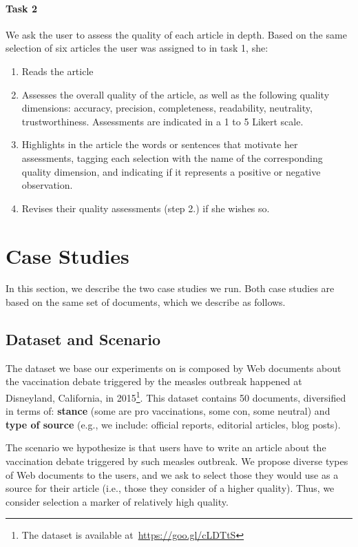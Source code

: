 \documentclass{llncs}
\begin{document}
\paragraph{Task 2}
We ask the user to assess the quality of each article in depth. Based on the same selection of six articles the user was assigned to in task 1, she:
\begin{enumerate}
\item Reads the article
\item Assesses the overall quality of the article, as well as the following quality dimensions: accuracy, precision, completeness, readability, neutrality, trustworthiness. Assessments are indicated in a 1 to 5 Likert scale.
\item Highlights in the article the words or sentences that motivate her assessments, tagging each selection with the name of the corresponding quality dimension, and indicating if it represents a positive or negative observation.
\item Revises their quality assessments (step 2.) if she wishes so.
\end{enumerate}

\section{Case Studies}
\label{sec:results}
In this section, we describe the two case studies we run. Both case studies are based on the same set of documents, which we describe as follows.
\subsection{Dataset and Scenario}
The dataset we base our experiments on is composed by Web documents about the vaccination debate triggered by the measles outbreak happened at Disneyland, California, in 2015\footnote{The dataset is available at~\url{https://goo.gl/cLDTtS}}. This dataset contains 50 documents, diversified in terms of:
{\bf stance} (some are pro vaccinations, some con, some neutral) and {\bf type of source} (e.g., we include: official reports, editorial articles, blog posts).

The scenario we hypothesize is that users have to write an article about the vaccination debate triggered by such measles outbreak. We propose diverse types of Web documents to the users, and we ask to select those they would use as a source for their article (i.e., those they consider of a higher quality). Thus, we consider selection a marker of relatively high quality.%
%
%
%
%
%
\end{document}
